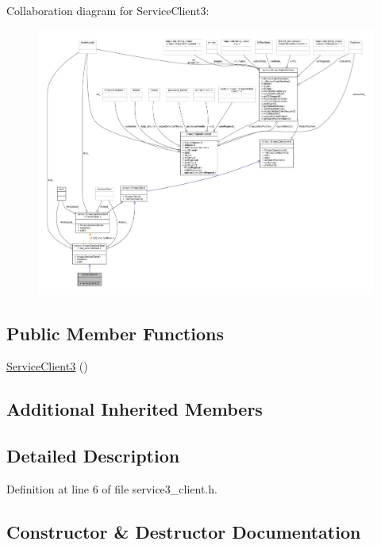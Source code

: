 Collaboration diagram for Service\+Client3\+:
\nopagebreak
\begin{figure}[H]
\begin{center}
\leavevmode
\includegraphics[width=350pt]{classServiceClient3__coll__graph}
\end{center}
\end{figure}
\subsection*{Public Member Functions}
\begin{DoxyCompactItemize}
\item 
\hyperlink{classServiceClient3_af8423c7889362ba8220d4cfbc71d2ff4}{Service\+Client3} ()
\end{DoxyCompactItemize}
\subsection*{Additional Inherited Members}


\subsection{Detailed Description}


Definition at line 6 of file service3\+\_\+client.\+h.



\subsection{Constructor \& Destructor Documentation}
